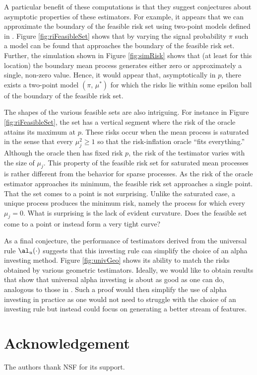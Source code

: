 \documentclass[12pt]{article}
\begin{document}
 A particular benefit of these computations is that they suggest conjectures
 about asymptotic properties of these estimators.  For example, it appears that
 we can approximate the boundary of the feasible risk set using two-point models
 defined in .  Figure \ref{fig:riFeasibleSet} shows that by varying
 the signal probability $\pi$ such a model can be found that approaches the
 boundary of the feasible risk set.  Further, the simulation shown in Figure
 \ref{fig:simRisk} shows that (at least for this location) the boundary mean
 process generates either zero or approximately a single, non-zero value.
  Hence, it would appear that, asymptotically in $p$, there exists a two-point
 model $(\pi,\,\mu^{*})$ for which the risks lie within some epsilon ball of the
 boundary of the feasible risk set.


 The shapes of the various feasible sets are also intriguing.  For instance in
 Figure \ref{fig:riFeasibleSet}, the set has a vertical segment where the risk
 of the oracle attains its maximum at $p$.  These risks occur when the mean
 process is saturated in the sense that every $\mu_j^2 \ge 1$ so that the
 risk-inflation oracle ``fits everything.''  Although the oracle then has fixed
 risk $p$, the risk of the testimator varies with the size of $\mu_j$.  This
 property of the feasible risk set for saturated mean processes is rather
 different from the behavior for sparse processes.  As the risk of the oracle
 estimator approaches its minimum, the feasible risk set approaches a single
 point.  That the set comes to a point is not surprising.  Unlike the saturated
 case, a unique process produces the minimum risk, namely the process for which
 every $\mu_j = 0$.  What is surprising is the lack of evident curvature.  Does
 the feasible set come to a point or instead form a very tight curve?
 

 As a final conjecture, the performance of testimators derived from the
 universal rule $\al_u(\cdot)$ suggests that this investing rule can simplify
 the choice of an alpha investing method.  Figure \ref{fig:univGeo} shows its
 ability to match the risks obtained by various geometric testimators.  Ideally,
 we would like to obtain results that show that universal alpha investing is about
 as good as one can do, analogous to those in \citet{rissanen83}.  Such a proof would
 then simplify the use of alpha investing in practice as one would not need to
 struggle with the choice of an investing rule but instead could focus on
 generating a better stream of features.


\section*{Acknowledgement}

The authors thank NSF for its support.





\end{document}
